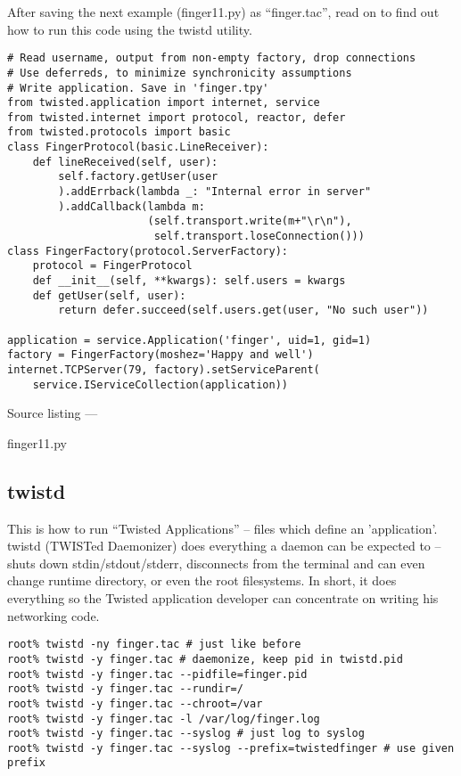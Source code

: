 After saving the next example (finger11.py) as ``finger.tac'', read on to find out how to run this code using the twistd utility.\begin{verbatim}
# Read username, output from non-empty factory, drop connections
# Use deferreds, to minimize synchronicity assumptions
# Write application. Save in 'finger.tpy'
from twisted.application import internet, service
from twisted.internet import protocol, reactor, defer
from twisted.protocols import basic
class FingerProtocol(basic.LineReceiver):
    def lineReceived(self, user):
        self.factory.getUser(user
        ).addErrback(lambda _: "Internal error in server"
        ).addCallback(lambda m:
                      (self.transport.write(m+"\r\n"),
                       self.transport.loseConnection()))
class FingerFactory(protocol.ServerFactory):
    protocol = FingerProtocol
    def __init__(self, **kwargs): self.users = kwargs
    def getUser(self, user):
        return defer.succeed(self.users.get(user, "No such user"))

application = service.Application('finger', uid=1, gid=1)
factory = FingerFactory(moshez='Happy and well')
internet.TCPServer(79, factory).setServiceParent(
    service.IServiceCollection(application))
\end{verbatim}\parbox[b]{\linewidth}{\begin{center}Source listing --- \begin{em}finger11.py\end{em}\end{center}}

\subsection{twistd}


This is how to run ``Twisted Applications'' -- files which define an 'application'. twistd (TWISTed Daemonizer) does everything a daemon can be expected to -- shuts down stdin/stdout/stderr, disconnects from the terminal and can even change runtime directory, or even the root filesystems. In short, it does everything so the Twisted application developer can concentrate on writing his networking code. \begin{verbatim}
root% twistd -ny finger.tac # just like before
root% twistd -y finger.tac # daemonize, keep pid in twistd.pid
root% twistd -y finger.tac --pidfile=finger.pid
root% twistd -y finger.tac --rundir=/
root% twistd -y finger.tac --chroot=/var
root% twistd -y finger.tac -l /var/log/finger.log
root% twistd -y finger.tac --syslog # just log to syslog
root% twistd -y finger.tac --syslog --prefix=twistedfinger # use given prefix
\end{verbatim}
